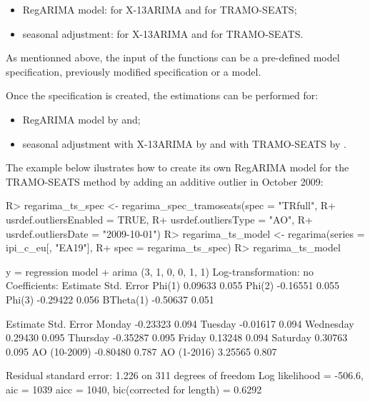 \documentclass[article]{jss}
\providecommand{\tightlist}{%
  \setlength{\itemsep}{0pt}\setlength{\parskip}{0pt}}
\begin{document}
\begin{itemize}
\tightlist
\item
  RegARIMA model:  for X-13ARIMA and
   for TRAMO-SEATS;
\item
  seasonal adjustment:  for X-13ARIMA and
   for TRAMO-SEATS.
\end{itemize}

As mentionned above, the input of the functions can be a pre-defined
 model specification, previously modified
specification or a model.

Once the specification is created, the estimations can be performed for:

\begin{itemize}
\tightlist
\item
  RegARIMA model by  and;
\item
  seasonal adjustment with X-13ARIMA by  and with
  TRAMO-SEATS by .
\end{itemize}

The example below ilustrates how to create its own RegARIMA model for
the TRAMO-SEATS method by adding an additive outlier in October 2009:

\begin{CodeChunk}

\begin{CodeInput}
R> regarima_ts_spec <- regarima_spec_tramoseats(spec = "TRfull",
R+              usrdef.outliersEnabled = TRUE,
R+              usrdef.outliersType = "AO",
R+              usrdef.outliersDate = "2009-10-01")
R> regarima_ts_model <- regarima(series = ipi_c_eu[, "EA19"],
R+                               spec = regarima_ts_spec)
R> regarima_ts_model
\end{CodeInput}

\begin{CodeOutput}
y = regression model + arima (3, 1, 0, 0, 1, 1)
Log-transformation: no
Coefficients:
          Estimate Std. Error
Phi(1)     0.09633      0.055
Phi(2)    -0.16551      0.055
Phi(3)    -0.29422      0.056
BTheta(1) -0.50637      0.051

             Estimate Std. Error
Monday       -0.23323      0.094
Tuesday      -0.01617      0.094
Wednesday     0.29430      0.095
Thursday     -0.35287      0.095
Friday        0.13248      0.094
Saturday      0.30763      0.095
AO (10-2009) -0.80480      0.787
AO (1-2016)   3.25565      0.807


Residual standard error: 1.226 on 311 degrees of freedom
Log likelihood = -506.6, aic =  1039 aicc =  1040, bic(corrected for length) = 0.6292
\end{CodeOutput}
\end{CodeChunk}
\end{document}
